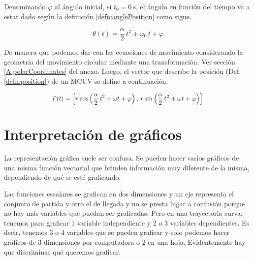 Denominando $\varphi$ al ángulo inicial, si $t_0=\SI{0}{\second}$, el ángulo en función del tiempo va a estar dado según la definición \ref{defn:anglePosition} como sigue.

\begin{mdframed}[style=PropertyFrame]
    \begin{prop}
    \end{prop}
    \begin{equation*}
        \theta (t) = \frac{\alpha}{2} \, t^2 + \omega_0 \, t + \varphi
    \end{equation*}
\end{mdframed}

De manera que podemos dar con las ecuaciones de movimiento considerando la geometría del movimiento circular mediante una transformación.
Ver sección \ref{A:polarCoordinates} del anexo.
Luego, el vector que describe la posición (Def. \ref{defn:position}) de un MCUV se define a continuación.

\begin{mdframed}[style=DefinitionFrame]
    \begin{defn}
    \end{defn}
    \begin{equation*}
        \scale{0.94}{
        \xyz(t) = \inBrackets{r \cos{\left(\frac{\alpha}{2} \, t^2 + \omega t + \varphi\right)} \, , \, r \sin{\left(\frac{\alpha}{2} \, t^2 + \omega t + \varphi\right)}}
        }
    \end{equation*}
\end{mdframed}


\section{Interpretación de gráficos}

La representación gráfica suele ser confusa.
Se pueden hacer varios gráficos de una misma función vectorial que brinden información muy diferente de la misma, dependiendo de qué se esté graficando.

Las funciones escalares se grafican en dos dimensiones y un eje representa el conjunto de partida y otro el de llegada y no se presta lugar a confusión porque no hay más variables que puedan ser graficadas.
Pero en una trayectoria curva, tenemos para graficar 1 variable independiente y 2 o 3 variables dependientes.
Es decir, tenemos 3 o 4 variables que se pueden graficar y solo podemos hacer gráficos de 3 dimensiones por computadora o 2 en una hoja.
Evidentemente hay que discriminar qué queremos graficar.

